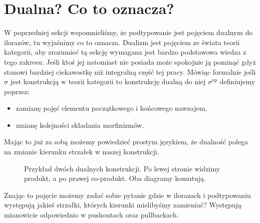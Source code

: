 \section{Dualna? Co to oznacza?}
W poprzedniej sekcji wspomnieliśmy, że podtypowanie jest pojęciem dualnym do ilorazów, tu wyjaśnimy co to oznacza. Dualizm jest pojęciem ze świata teorii kategorii, aby zrozumieć tą sekcję wymagana jest bardzo podstawowa wiedza z tego zakresu. Jeśli ktoś jej natomiast nie posiada może spokojnie ją pominąć gdyż stanowi bardziej ciekawostkę niż integralną część tej pracy. Mówiąc formalnie jeśli $\sigma$ jest konstrukcją w teorii kategorii to konstrukcję dualną do niej $\sigma^{\textrm{op}}$ definiujemy poprzez: 
\begin{itemize}
    \item zamianę pojęć elementu początkowego i końcowego nawzajem,
    \item zmianę kolejności składania morfinizmów.
\end{itemize}
Mając to już za sobą możemy powiedzieć prostym językiem, że dualność polega na zmianie kierunku strzałek w naszej konstrukcji. 
\begin{figure}[!htp]
    \centering
    \caption{Przykład dwóch dualnych konstrukcji. Po lewej stronie widzimy produkt, a po prawej co-produkt. Oba diagramy komutują.}
    \label{fig:fourier_vis}
\end{figure}
Znając to pojęcie możemy zadać sobie pytanie gdzie w ilorazach i podtypowaniu występują jakieś strzałki, których kierunki mielibyśmy zamieniać? Występują mianowicie odpowiednio w pushoutach oraz pullbackach.
